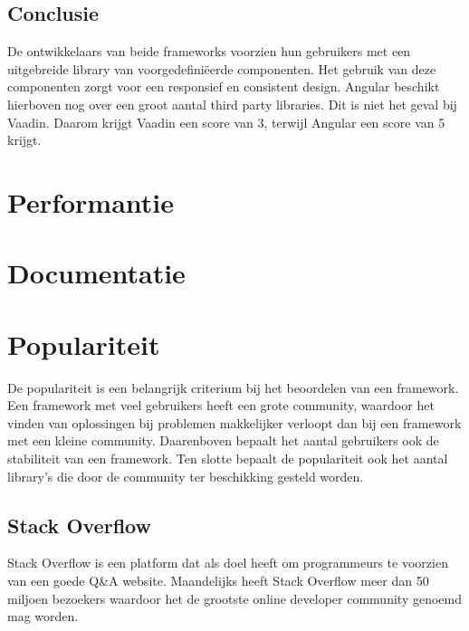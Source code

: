 \subsection{Conclusie}
De ontwikkelaars van beide frameworks voorzien hun gebruikers met een uitgebreide library van voorgedefiniëerde componenten. Het gebruik van deze componenten zorgt voor een responsief en consistent design. Angular beschikt hierboven nog over een groot aantal third party libraries. Dit is niet het geval bij Vaadin.
Daarom krijgt Vaadin een score van 3, terwijl Angular een score van 5 krijgt.

\section{Performantie}

\section{Documentatie}

\section{Populariteit}
De populariteit is een belangrijk criterium bij het beoordelen van een framework. Een framework met veel gebruikers heeft een grote community, waardoor het vinden van oplossingen bij problemen makkelijker verloopt dan bij een framework met een kleine community. Daarenboven bepaalt het aantal gebruikers ook de stabiliteit van een framework. Ten slotte bepaalt de populariteit ook het aantal library's die door de community ter beschikking gesteld worden.
\subsection{Stack Overflow}
Stack Overflow is een platform dat als doel heeft om programmeurs te voorzien van een goede Q\&A website. Maandelijks heeft Stack Overflow meer dan 50 miljoen bezoekers waardoor het de grootste online developer community genoemd mag worden. 
